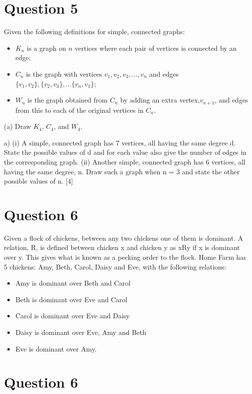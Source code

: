 \documentclass[]{report}
\begin{document}
\section*{Question 5}
Given the following definitions for simple, connected graphs:
\begin{itemize}
	\item $K_n$ is a graph on $n$ vertices where each pair of vertices is connected by an edge;
	\item $C_n$ is the graph with vertices $v_1, v_2, v_3, \dots, v_n$ and edges $\{v_1,v_2\}, \{v_2,v_3\}, \dots\{v_n, v_1\}$;
	\item $W_n$ is the graph obtained from $C_n$ by adding an extra vertex,$v_{n+1}$, and edges
	from this to each of the original vertices in $C_n$.
\end{itemize}
(a) Draw $K_4$, $C_4$, and $W_4$. 

a) (i) A simple, connected graph has 7 vertices, all having the same degree d.
State the possible values of d and for each value also give the number of edges
in the corresponding graph.
(ii) Another simple, connected graph has 6 vertices, all having the same degree,
n. Draw such a graph when n = 3 and state the other possible values of n.
[4]
\newpage
\section*{Question 6}
Given a flock of chickens, between any two chickens one of them is
dominant. A relation, R, is defined between chicken x and chicken y as xRy if x is
dominant over y. This gives what is known as a pecking order to the flock. Home
Farm has 5 chickens: Amy, Beth, Carol, Daisy and Eve, with the following relations:

\begin{itemize}
	\item Amy is dominant over Beth and Carol
	\item Beth is dominant over Eve and Carol
	\item Carol is dominant over Eve and Daisy
	\item Daisy is dominant over Eve, Amy and Beth
	\item Eve is dominant over Amy.
\end{itemize}

\newpage
\section*{Question 6}
\end{document}
